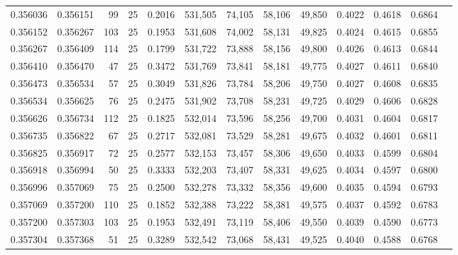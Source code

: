 \begin{tabular}{rrrrrrrrrrrrr}
0.356036 & 0.356151 &    99 &  25 &                                     0.2016 & 531,505 &  74,105 &  58,106 &  49,850 & 0.4022 & 0.4618 & 0.6864 \\
0.356152 & 0.356267 &   103 &  25 &                                     0.1953 & 531,608 &  74,002 &  58,131 &  49,825 & 0.4024 & 0.4615 & 0.6855 \\
0.356267 & 0.356409 &   114 &  25 &                                     0.1799 & 531,722 &  73,888 &  58,156 &  49,800 & 0.4026 & 0.4613 & 0.6844 \\
0.356410 & 0.356470 &    47 &  25 &                                     0.3472 & 531,769 &  73,841 &  58,181 &  49,775 & 0.4027 & 0.4611 & 0.6840 \\
0.356473 & 0.356534 &    57 &  25 &                                     0.3049 & 531,826 &  73,784 &  58,206 &  49,750 & 0.4027 & 0.4608 & 0.6835 \\
0.356534 & 0.356625 &    76 &  25 &                                     0.2475 & 531,902 &  73,708 &  58,231 &  49,725 & 0.4029 & 0.4606 & 0.6828 \\
0.356626 & 0.356734 &   112 &  25 &                                     0.1825 & 532,014 &  73,596 &  58,256 &  49,700 & 0.4031 & 0.4604 & 0.6817 \\
0.356735 & 0.356822 &    67 &  25 &                                     0.2717 & 532,081 &  73,529 &  58,281 &  49,675 & 0.4032 & 0.4601 & 0.6811 \\
0.356825 & 0.356917 &    72 &  25 &                                     0.2577 & 532,153 &  73,457 &  58,306 &  49,650 & 0.4033 & 0.4599 & 0.6804 \\
0.356918 & 0.356994 &    50 &  25 &                                     0.3333 & 532,203 &  73,407 &  58,331 &  49,625 & 0.4034 & 0.4597 & 0.6800 \\
0.356996 & 0.357069 &    75 &  25 &                                     0.2500 & 532,278 &  73,332 &  58,356 &  49,600 & 0.4035 & 0.4594 & 0.6793 \\
0.357069 & 0.357200 &   110 &  25 &                                     0.1852 & 532,388 &  73,222 &  58,381 &  49,575 & 0.4037 & 0.4592 & 0.6783 \\
0.357200 & 0.357303 &   103 &  25 &                                     0.1953 & 532,491 &  73,119 &  58,406 &  49,550 & 0.4039 & 0.4590 & 0.6773 \\
0.357304 & 0.357368 &    51 &  25 &                                     0.3289 & 532,542 &  73,068 &  58,431 &  49,525 & 0.4040 & 0.4588 & 0.6768 \\

\end{tabular}
